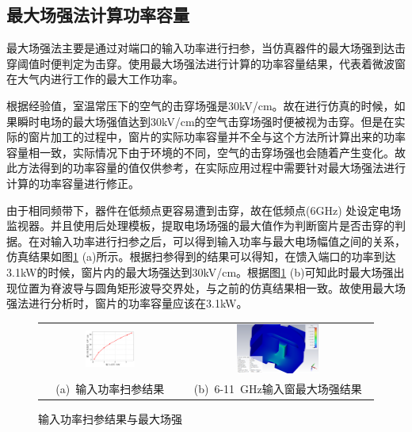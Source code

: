 \documentclass[master]{thesis-uestc}
\begin{document}
\subsection{最大场强法计算功率容量}\label{subsec:X最大场强功率容量}
最大场强法主要是通过对端口的输入功率进行扫参，当仿真器件的最大场强到达击穿阈值时便判定为击穿。使用最大场强法进行计算的功率容量结果，代表着微波窗在大气内进行工作的最大工作功率。

根据经验值，室温常压下的空气的击穿场强是30kV/cm。故在进行仿真的时候，如果瞬时电场的最大场强值达到30kV/cm的空气击穿场强时便被视为击穿。但是在实际的窗片加工的过程中，窗片的实际功率容量并不全与这个方法所计算出来的功率容量相一致，实际情况下由于环境的不同，空气的击穿场强也会随着产生变化。故此方法得到的功率容量的值仅供参考，在实际应用过程中需要针对最大场强法进行计算的功率容量进行修正。

由于相同频带下，器件在低频点更容易遭到击穿，故在低频点(6GHz) 处设定电场监视器。并且使用后处理模板，提取电场场强的最大值作为判断窗片是否击穿的判据。在对输入功率进行扫参之后，可以得到输入功率与最大电场幅值之间的关系，仿真结果如图\ref{fig:X输入窗最大场强结果} (a)所示。根据扫参得到的结果可以得知，在馈入端口的功率到达3.1kW的时候，窗片内的最大场强达到30kV/cm。根据图\ref{fig:X输入窗最大场强结果} (b)可知此时最大场强出现位置为脊波导与圆角矩形波导交界处，与之前的仿真结果相一致。故使用最大场强法进行分析时，窗片的功率容量应该在3.1kW。

\begin{figure}[!htb]
    \small
    \centering
    \begin{tabular}{@{\ }c@{\ }c}
        \includegraphics[width=0.37\textwidth]{pic/chapter3/X输入功率VS最大场强.png} & 
        \hspace{5pt}
        \includegraphics[width=0.45\textwidth]{pic/chapter3/X频段最大功率场强.png}     \\
        \mbox{\small (a) 输入功率扫参结果}                                                                               & 
        \mbox{\small (b) 6-11 GHz输入窗最大场强结果}                                                                                  \\
    \end{tabular}
    \caption{输入功率扫参结果与最大场强}
    \label{fig:X输入窗最大场强结果}
\end{figure}
\end{document}
